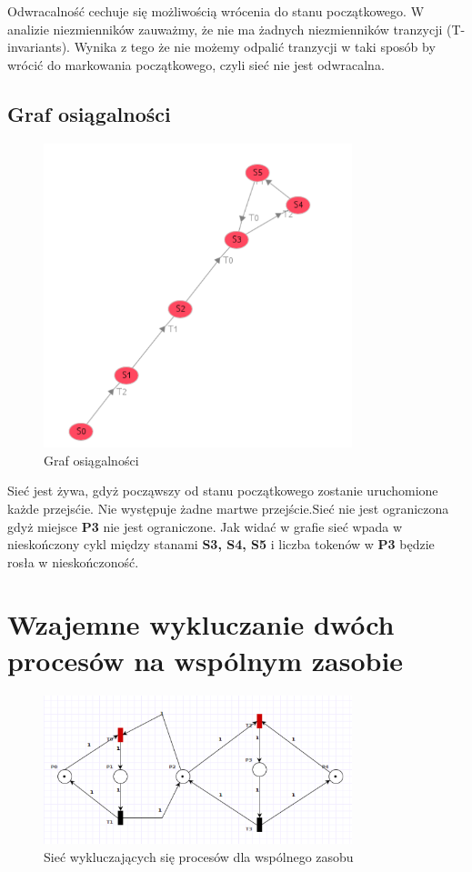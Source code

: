 \documentclass{article}
\begin{document}
Odwracalność cechuje się możliwością wrócenia do stanu początkowego. 
W analizie niezmienników zauważmy, że nie ma żadnych niezmienników tranzycji (T-invariants).
Wynika z tego że nie możemy odpalić tranzycji w taki sposób by wrócić do markowania początkowego,
czyli sieć nie jest odwracalna. 

\subsection{Graf osiągalności}
\begin{figure}[H]
    \centering
    \includegraphics[width=0.8\textwidth, height=0.4\textheight]{zad2_graph.png}
    \caption{Graf osiągalności}
\end{figure}

Sieć jest żywa, gdyż począwszy od stanu początkowego zostanie uruchomione każde przejsćie.
Nie występuje żadne martwe przejście.Sieć nie jest ograniczona gdyż miejsce \textbf{P3}
nie jest ograniczone. Jak widać w grafie sieć wpada w nieskończony cykl między stanami \textbf{S3, S4, S5}
i liczba tokenów w \textbf{P3} będzie rosła w nieskończoność.

\section{Wzajemne wykluczanie dwóch procesów na wspólnym zasobie}
\begin{figure}[H]
    \centering
    \includegraphics[width=0.8\textwidth, height=0.4\textheight]{zad3.png}
    \caption{Sieć wykluczających się procesów dla wspólnego zasobu}
\end{figure}
\end{document}
